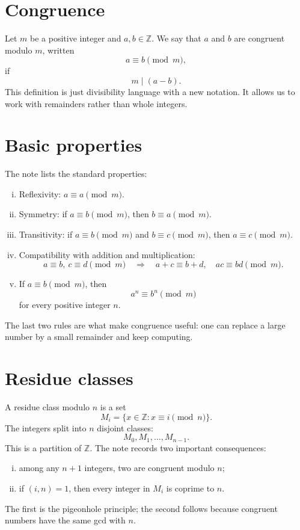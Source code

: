 
\section{Congruence}

Let \(m\) be a positive integer and \(a,b\in\mathbb Z\).  We say that \(a\) and \(b\) are congruent modulo \(m\), written
\[
  a\equiv b\pmod m,
\]
if
\[
  m\mid(a-b).
\]
This definition is just divisibility language with a new notation.  It allows us to work with remainders rather than whole integers.

\section{Basic properties}

The note lists the standard properties:
\begin{enumerate}[(i)]
  \item Reflexivity: \(a\equiv a\pmod m\).
  \item Symmetry: if \(a\equiv b\pmod m\), then \(b\equiv a\pmod m\).
  \item Transitivity: if \(a\equiv b\pmod m\) and \(b\equiv c\pmod m\), then \(a\equiv c\pmod m\).
  \item Compatibility with addition and multiplication:
  \[
    a\equiv b,\ c\equiv d\pmod m
    \quad\Rightarrow\quad
    a+c\equiv b+d,\quad ac\equiv bd\pmod m.
  \]
  \item If \(a\equiv b\pmod m\), then
  \[
    a^n\equiv b^n\pmod m
  \]
  for every positive integer \(n\).
\end{enumerate}

The last two rules are what make congruence useful: one can replace a large number by a small remainder and keep computing.

\section{Residue classes}

A residue class modulo \(n\) is a set
\[
  M_i=\{x\in\mathbb Z:x\equiv i\pmod n\}.
\]
The integers split into \(n\) disjoint classes:
\[
  M_0,M_1,\ldots,M_{n-1}.
\]
This is a partition of \(\mathbb Z\).  The note records two important consequences:
\begin{enumerate}[(i)]
  \item among any \(n+1\) integers, two are congruent modulo \(n\);
  \item if \((i,n)=1\), then every integer in \(M_i\) is coprime to \(n\).

\end{enumerate}
The first is the pigeonhole principle; the second follows because congruent numbers have the same gcd with \(n\).

